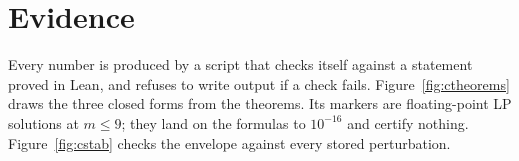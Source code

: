 \section{Evidence}
\label{sec:evidence}

Every number is produced by a script that checks itself against a statement proved in Lean,
and refuses to write output if a check fails. Figure~\ref{fig:ctheorems} draws the three
closed forms from the theorems. Its markers are floating-point LP solutions at $m\le9$; they
land on the formulas to $10^{-16}$ and certify nothing. Figure~\ref{fig:cstab} checks the
envelope against every stored perturbation.

\begin{table}[t]
\caption{Evidence packages. Each script self-checks against a Lean statement.}
\label{tab:evidence}
\centering
\footnotesize
{}
\end{table}

